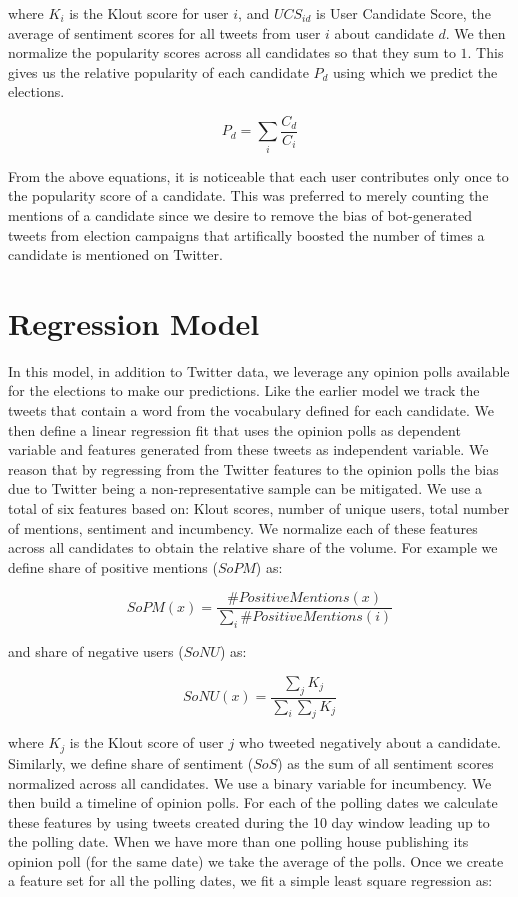 where $K_i$ is the Klout score for user $i$, and $UCS_{id}$ is User Candidate Score, the average of sentiment scores for all tweets from user $i$ about candidate $d$.
We then normalize the popularity scores across all candidates so that they sum to $1$.
This gives us the relative popularity of each candidate $P_d$ using which we predict the elections.

\begin{equation}
{P_d} = \sum_i \frac{C_d}{C_i}
\end{equation}

From the above equations, it is noticeable that each user contributes only once to the popularity score of a candidate.
This was preferred to merely counting the mentions of a candidate since we desire to remove the bias of 
bot-generated tweets from election campaigns that artifically
boosted the number of times a candidate is mentioned on Twitter.

\section{Regression Model}
In this model, in addition to Twitter data, we leverage any opinion polls available for the elections 
to make our predictions.
Like the earlier model we track the tweets that contain a word from the vocabulary defined for each candidate.
We then define a linear regression fit that uses the opinion polls as dependent variable and features generated from these tweets as independent variable.
We reason that by regressing from the Twitter features to the opinion polls the bias due to Twitter being a non-representative sample
can be mitigated.
We use a total of six features based on: Klout scores, number of unique users, total number of mentions, sentiment and incumbency.
We normalize each of these features across all candidates to obtain the relative share of the volume. 
For example we define share of positive mentions ($SoPM$)  as: 

\begin{equation}
SoPM(x) = \frac{\#PositiveMentions(x)}{\sum_i \#PositiveMentions(i)} 
\end{equation}

and share of negative users ($SoNU$) as:

\begin{equation}
SoNU(x) = \frac{\sum_j K_j}{\sum_i \sum_j K_j}
\end{equation}

where $K_j$ is the Klout score of user $j$ who tweeted negatively about a candidate.
Similarly, we define share of sentiment ($SoS$) as the sum of all sentiment scores normalized across all candidates. 
We use a binary variable for incumbency. 
We then build a timeline of opinion polls. 
For each of the polling dates we calculate these features by using tweets created during the 10 day window 
leading up to the polling date.
When we have more than one polling house publishing its opinion poll (for the same date) we take the average of the polls. 
Once we create a feature set for all the polling dates, we fit a simple least square regression as:

